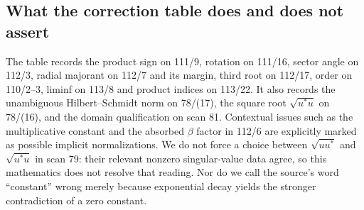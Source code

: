 \documentclass[11pt,a4paper]{article}
\begin{document}
\subsection{What the correction table does and does not assert}
The table records the product sign on 111/9, rotation on 111/16, sector angle on 112/3, radial majorant on 112/7 and its margin, third root on 112/17, order on 110/2--3, liminf on 113/8 and product indices on 113/22. It also records the unambiguous Hilbert--Schmidt norm on 78/(17), the square root $\sqrt{u^*u}$ on 78/(16), and the domain qualification on scan 81. Contextual issues such as the multiplicative constant and the absorbed $\beta$ factor in 112/6 are explicitly marked as possible implicit normalizations. We do not force a choice between $\sqrt{uu^*}$ and $\sqrt{u^*u}$ in scan 79: their relevant nonzero singular-value data agree, so this mathematics does not resolve that reading. Nor do we call the source's word ``constant'' wrong merely because exponential decay yields the stronger contradiction of a zero constant.
\end{document}
